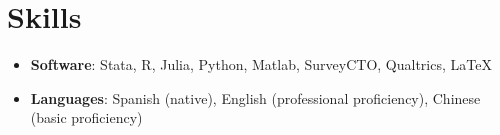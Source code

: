 \documentclass[letterpaper,10pt]{article}
\newcommand{\resumeSubItem}[1]{
  \item {\small #1}
}
\newcommand{\resumeSubHeadingListStart}{\begin{itemize}[leftmargin=0pt,label={}]}
\newcommand{\resumeSubHeadingListEnd}{\end{itemize}\vspace{-2pt}}
\begin{document}
\section{Skills}
\resumeSubHeadingListStart
  \resumeSubItem{\textbf{Software}: Stata, R, Julia, Python, Matlab, SurveyCTO, Qualtrics, \LaTeX}
  \resumeSubItem{\textbf{Languages}: Spanish (native), English (professional proficiency), Chinese (basic proficiency)}
\resumeSubHeadingListEnd
\end{document}
